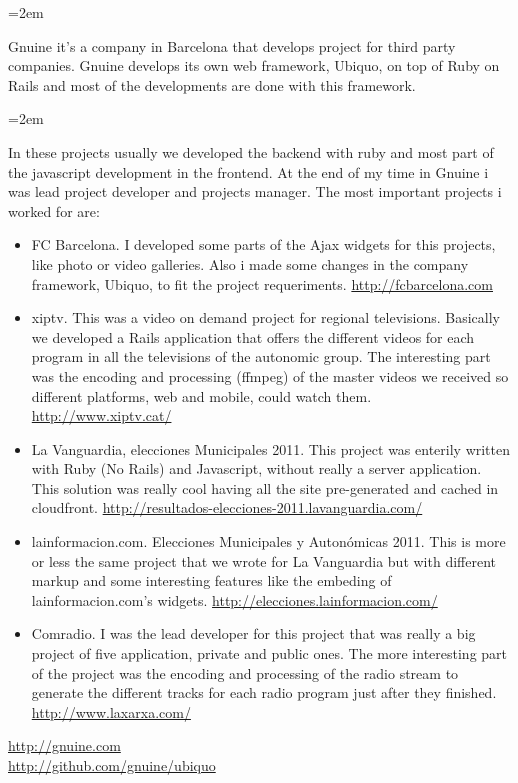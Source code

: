 \documentclass{scrartcl}
\newcommand{\MarginText}[1]{\marginpar{\raggedleft\itshape\small#1}} %
\newcommand{\Description}[1]{\hangindent=2em\hangafter=0\noindent\raggedright\footnotesize{#1}\par\normalsize\vspace{1em}} %
\begin{document}
\begin{cv}{}
\Description{\MarginText{Gnuine}Gnuine it's a company in Barcelona that develops
    project for third party companies. Gnuine
    develops its own web framework, Ubiquo, on top of Ruby on Rails and most of
    the developments are done with this framework.}
\Description{
    In these projects usually we developed the backend with ruby and
    most part of the javascript development in the frontend. At the
    end of my time in Gnuine i was lead project developer and projects manager.
    The most important projects i worked for are:
    \begin{itemize}
    \item FC Barcelona. I developed some parts of the Ajax widgets for
      this projects, like photo or video galleries. Also i made some
      changes in the company framework, Ubiquo, to fit the project
      requeriments. \href{http://fcbarcelona.com}{http://fcbarcelona.com}
    \item xiptv. This was a video on demand project for regional
      televisions. Basically we developed a Rails application that
      offers the different videos for each program in all the
      televisions of the autonomic group.
      The interesting part was the encoding and processing (ffmpeg) of the
      master videos we received so different platforms, web and
      mobile, could watch them. \href{http://www.xiptv.cat/}{http://www.xiptv.cat/}
    \item La Vanguardia, elecciones Municipales 2011. This project was
      enterily written with Ruby (No Rails) and Javascript, without really a
      server application. This solution was really cool having all the
      site pre-generated and cached in cloudfront. \href{http://resultados-elecciones-2011.lavanguardia.com/}{http://resultados-elecciones-2011.lavanguardia.com/}
    \item lainformacion.com. Elecciones Municipales y Autonómicas
      2011. This is more or less the same project that we wrote for
      La Vanguardia but with different markup and some interesting
      features like the embeding of lainformacion.com's widgets. \href{http://elecciones.lainformacion.com/}{http://elecciones.lainformacion.com/}
    \item Comradio. I was the lead developer for this project that was
      really a big project of five application, private and public ones.
      The more interesting part of the project was the encoding and
      processing of the radio stream to generate the different tracks
      for each radio program just after they finished. \href{http://www.laxarxa.com/}{http://www.laxarxa.com/}
    \end{itemize}
    \href{http://gnuine.com}{http://gnuine.com}
    \\\href{http://github.com/gnuine/ubiquo}{http://github.com/gnuine/ubiquo}}


\end{cv}
\end{document}
